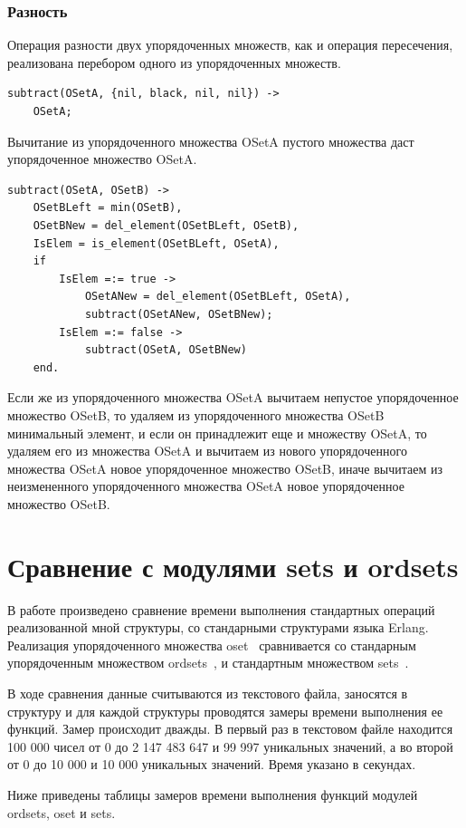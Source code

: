 		\subsubsection{Разность}
			Операция разности двух упорядоченных множеств, как и операция пересечения, реализована 
			перебором одного из упорядоченных множеств.
			\begin{lstlisting}
subtract(OSetA, {nil, black, nil, nil}) ->
    OSetA;
			\end{lstlisting}
			Вычитание из упорядоченного множества OSetA пустого множества даст упорядоченное множество OSetA.
			\begin{lstlisting}
subtract(OSetA, OSetB) ->
    OSetBLeft = min(OSetB),
    OSetBNew = del_element(OSetBLeft, OSetB),
    IsElem = is_element(OSetBLeft, OSetA),
    if 
        IsElem =:= true -> 
            OSetANew = del_element(OSetBLeft, OSetA),
            subtract(OSetANew, OSetBNew);
        IsElem =:= false -> 
            subtract(OSetA, OSetBNew)
    end.	 	
			\end{lstlisting}
			Если же из упорядоченного множества OSetA вычитаем непустое упорядоченное множество OSetB,
			то удаляем из упорядоченного множества OSetB минимальный элемент, и если он 
			принадлежит еще и множеству OSetA, то удаляем его из множества OSetA и вычитаем из нового
			упорядоченного множества OSetA новое упорядоченное множество OSetB, иначе вычитаем из неизмененного
			упорядоченного множества OSetA новое упорядоченное множество OSetB.
			
			
			
			
\section{Сравнение с модулями sets и ordsets}
	В работе произведено сравнение времени выполнения стандартных операций реализованной мной структуры, со 
	стандарными структурами языка Erlang. Реализация упорядоченного множества oset~\cite{osetR} сравнивается со стандарным 
	упорядоченным множеством ordsets~\cite{ordsetsR}, и	стандартным множеством sets~\cite{setsR}.
	
	В ходе сравнения данные считываются из текстового файла, заносятся в структуру и для каждой структуры проводятся
	замеры времени выполнения ее функций. Замер происходит дважды. В первый раз в текстовом файле находится 100 000 чисел 
	от 0 до 2 147 483 647 и 99 997 уникальных значений, а во второй от 0 до 10 000 и 10 000 уникальных значений. Время 
	указано в секундах.
	
	Ниже приведены таблицы замеров времени выполнения функций модулей ordsets, oset и sets.
	
